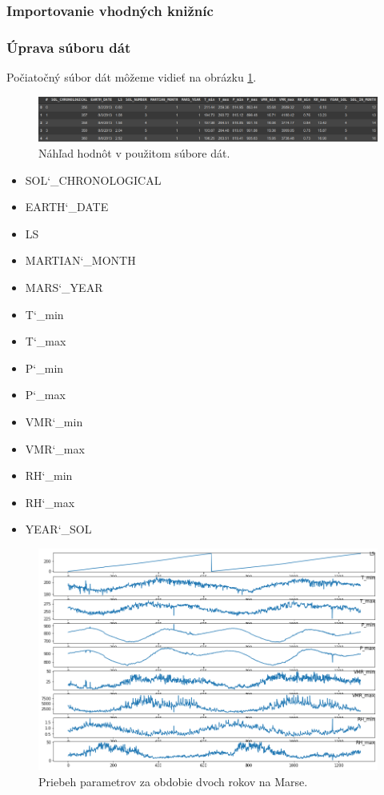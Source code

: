 \subsubsection{Importovanie vhodných knižníc}

\subsubsection{Úprava súboru dát}
Počiatočný súbor dát môžeme vidieť na obrázku \ref{dataset}.
\begin{figure}[!htbp]
  \centering
  \includegraphics[width=14cm]{img/datase.png}
  \caption{Náhľad hodnôt v použitom súbore dát.}
  \label{dataset}
\end{figure}

\begin{itemize}
    \item SOL\char`_CHRONOLOGICAL
    \item EARTH\char`_DATE
    \item LS
    \item MARTIAN\char`_MONTH
    \item MARS\char`_YEAR
    \item T\char`_min
    \item T\char`_max
    \item P\char`_min
    \item P\char`_max
    \item VMR\char`_min
    \item VMR\char`_max
    \item RH\char`_min
    \item RH\char`_max
    \item YEAR\char`_SOL
\end{itemize}

\begin{figure}[!htbp]
  \centering
  \includegraphics[width=16cm]{img/full_df.png}
  \caption{Priebeh parametrov za obdobie dvoch rokov na Marse.}
  \label{fulldf}
\end{figure}

